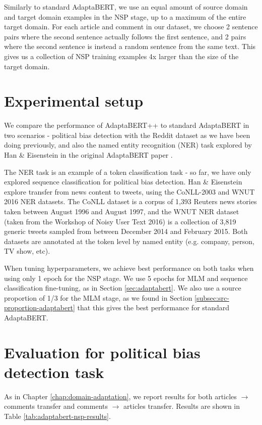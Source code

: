 Similarly to standard AdaptaBERT, we use an equal amount of source domain and target domain examples in the NSP stage, up to a maximum of the entire target domain. For each article and comment in our dataset, we choose 2 sentence pairs where the second sentence actually follows the first sentence, and 2 pairs where the second sentence is instead a random sentence from the same text. This gives us a collection of NSP training examples 4x larger than the size of the target domain.

\section{Experimental setup}

We compare the performance of AdaptaBERT++ to standard AdaptaBERT in two scenarios - political bias detection with the Reddit dataset as we have been doing previously, and also the named entity recognition (NER) task explored by Han \& Eisenstein in the original AdaptaBERT paper \cite{adaptabert}.

The NER task is an example of a token classification task - so far, we have only explored sequence classification for political bias detection. Han \& Eisenstein explore transfer from news content to tweets, using the CoNLL-2003 and WNUT 2016 NER datasets. The CoNLL dataset \cite{conll} is a corpus of 1,393 Reuters news stories \cite{reuters} taken between August 1996 and August 1997, and the WNUT NER dataset \cite{wnut} (taken from the Workshop of Noisy User Text 2016) is a collection of 3,819 generic tweets sampled from between December 2014 and February 2015. Both datasets are annotated at the token level by named entity (e.g. company, person, TV show, etc).

When tuning hyperparameters, we achieve best performance on both tasks when using only 1 epoch for the NSP stage. We use 5 epochs for MLM and sequence classification fine-tuning, as in Section \ref{sec:adaptabert}. We also use a source proportion of 1/3 for the MLM stage, as we found in Section \ref{subsec:src-proportion-adaptabert} that this gives the best performance for standard AdaptaBERT.

\section{Evaluation for political bias detection task}

As in Chapter \ref{chap:domain-adaptation}, we report results for both articles $ \rightarrow $ comments transfer and comments $ \rightarrow $ articles transfer. Results are shown in Table \ref{tab:adaptabert-nsp-results}.

